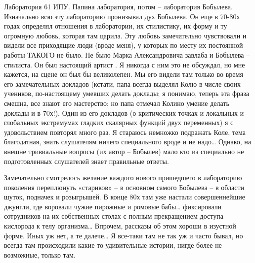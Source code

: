Лаборатория 61 ИПУ. Папина лаборатория, потом – лаборатория Бобылева. Изначально всю эту лабораторию пронизывал дух Бобылева. Он еще в 70-80х годах определял отношения в лаборатории, их стилистику, их форму и ту огромную любовь, которая там царила. Эту любовь замечательно чувствовали и видели все приходящие люди (вроде меня), у которых по месту их постоянной работы ТАКОГО не было. Не было Марка Александровича завлаба и Бобылева – стилиста. Он был настоящий артист . Я никогда с ним это не обсуждал, но мне кажется, на сцене он был бы великолепен. Мы его видели там только во время его замечательных докладов (кстати, папа всегда выделял Колю в числе своих учеников, по-настоящему умевших делать доклады; я понимаю, теперь эта фраза смешна, все знают его мастерство; но папа отмечал Колино умение делать доклады и в 70х!). Один из его докладов (о критических точках и локальных и глобальных экстремумах гладких скалярных функций двух переменных) я с удовольствием повторял много раз.  Я стараюсь немножко подражать Коле, тема благодатная, знать слушателям ничего специального вроде и не надо… Однако, на внешне тривиальные вопросы (их автор – Бобылев) мало кто из специально не подготовленных слушателей знает правильные ответы.

Замечательно смотрелось желание каждого нового пришедшего в лабораторию поколения переплюнуть «стариков» – в основном самого Бобылева – в области шуток, подначек и розыгрышей. В конце 80х там уже настали совершеннейшие джунгли, где воровали чужие пирожные и ромовые бабы… фиксировали сотрудников на их собственных столах с полным прекращением доступа кислорода к телу организма… Впрочем, рассказы об этом хороши в изустной форме. Иных уж нет, а те далече… Я все-таки там не так уж и часто бывал, но всегда там происходили какие-то удивительные истории, нигде более не возможные, только там.

